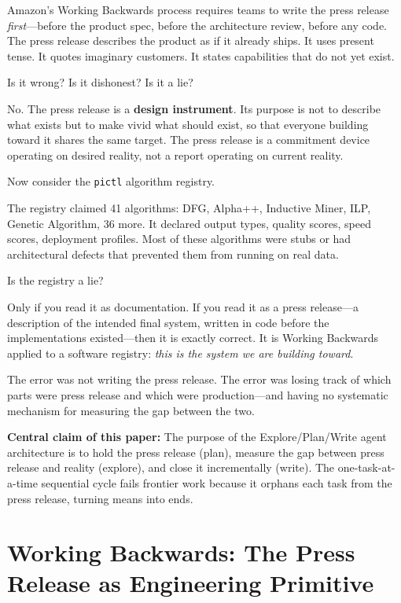 \documentclass[11pt,a4paper]{article}
\newcommand{\code}[1]{\texttt{#1}}
\begin{document}
Amazon's Working Backwards process requires teams to write the press release
\emph{first}---before the product spec, before the architecture review, before
any code.  The press release describes the product as if it already ships.  It
uses present tense.  It quotes imaginary customers.  It states capabilities
that do not yet exist.

Is it wrong?  Is it dishonest?  Is it a lie?

No.  The press release is a \textbf{design instrument}.  Its purpose is not to
describe what exists but to make vivid what should exist, so that everyone
building toward it shares the same target.  The press release is a commitment
device operating on desired reality, not a report operating on current reality.

Now consider the \code{pictl} algorithm registry.

The registry claimed 41 algorithms: DFG, Alpha++, Inductive Miner, ILP, Genetic
Algorithm, 36 more.  It declared output types, quality scores, speed scores,
deployment profiles.  Most of these algorithms were stubs or had architectural
defects that prevented them from running on real data.

Is the registry a lie?

Only if you read it as documentation.  If you read it as a press release---a
description of the intended final system, written in code before the
implementations existed---then it is exactly correct.  It is Working Backwards
applied to a software registry: \emph{this is the system we are building
toward}.

The error was not writing the press release.  The error was losing track of
which parts were press release and which were production---and having no
systematic mechanism for measuring the gap between the two.

\begin{callout}
  \textbf{Central claim of this paper:} The purpose of the Explore/Plan/Write
  agent architecture is to hold the press release (plan), measure the gap
  between press release and reality (explore), and close it incrementally
  (write).  The one-task-at-a-time sequential cycle fails frontier work
  because it orphans each task from the press release, turning means into ends.
\end{callout}

\section{Working Backwards: The Press Release as Engineering Primitive}
\end{document}

